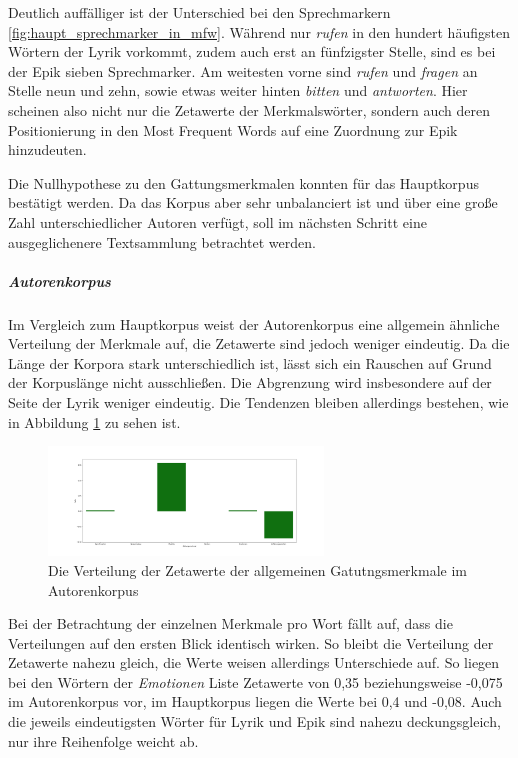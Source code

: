 \documentclass[a4paper,10p]{article}
\begin{document}
Deutlich auffälliger ist der Unterschied bei den Sprechmarkern \ref{fig:haupt_sprechmarker_in_mfw}. Während nur \textit{rufen} in den hundert häufigsten Wörtern der Lyrik vorkommt, zudem auch erst an fünfzigster Stelle, sind es bei der Epik sieben Sprechmarker. Am weitesten vorne sind \textit{rufen} und \textit{fragen} an Stelle neun und zehn, sowie etwas weiter hinten \textit{bitten} und \textit{antworten}. Hier scheinen also nicht nur die Zetawerte der Merkmalswörter, sondern auch deren Positionierung in den Most Frequent Words auf eine Zuordnung zur Epik hinzudeuten. 

Die Nullhypothese zu den Gattungsmerkmalen konnten für das Hauptkorpus bestätigt werden. Da das Korpus aber sehr unbalanciert ist und über eine große Zahl unterschiedlicher Autoren verfügt, soll im nächsten Schritt eine ausgeglichenere Textsammlung betrachtet werden.

\subparagraph{Autorenkorpus} \quad \par 

Im Vergleich zum Hauptkorpus  weist der Autorenkorpus eine allgemein ähn\-lich\-e Verteilung der Merkmale auf, die  Zetawerte sind jedoch weniger eindeutig. Da die Länge der Korpora stark unterschiedlich ist, lässt sich ein Rauschen auf Grund der Korpuslänge nicht ausschließen. Die Abgrenzung wird insbesondere auf der Seite der Lyrik weniger eindeutig. Die Tendenzen bleiben allerdings bestehen, wie in Abbildung  \ref{fig:autoren_alle_merkmale} zu sehen ist. \par 

\begin{figure}
	\includegraphics[width=0.65\textwidth]{autoren_alle_merkmale.png}
	\caption{Die Verteilung der Zetawerte der allgemeinen Gatutngsmerkmale im Autorenkorpus}
	\label{fig:autoren_alle_merkmale}
\end{figure}

Bei der Betrachtung der einzelnen Merkmale pro Wort fällt auf, dass die Verteilungen auf den ersten Blick identisch wirken. So bleibt die Verteilung der Zetawerte nahezu gleich, die Werte weisen allerdings Unterschiede auf. So liegen bei den Wörtern der \emph{Emotionen} Liste Zetawerte von 0,35 beziehungsweise -0,075 im Autorenkorpus vor, im Hauptkorpus liegen die Werte bei 0,4 und -0,08. Auch die jeweils eindeutigsten Wörter für Lyrik und Epik sind nahezu deckungsgleich, nur ihre Reihenfolge weicht ab. \par 
\end{document}
